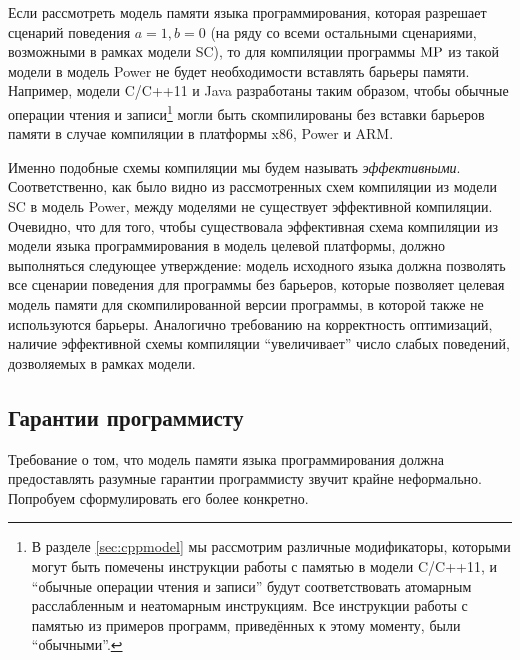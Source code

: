 Если рассмотреть модель памяти языка программирования, которая разрешает сценарий поведения $a=1,b=0$
(на ряду со всеми остальными сценариями, возможными в рамках модели SC), то для компиляции программы
${\rm MP}$ из такой модели в модель Power не будет необходимости вставлять барьеры памяти.
Например, модели C/C++11 \cite{Batty-al:POPL11} и Java \cite{Manson-al:POPL05} разработаны таким образом, чтобы
обычные операции чтения и записи\footnote{В разделе \ref{sec:cppmodel} мы рассмотрим различные модификаторы, которыми могут
быть помечены инструкции работы с памятью в модели C/C++11, и ``обычные операции чтения и записи'' будут соответствовать
атомарным расслабленным и неатомарным инструкциям.
Все инструкции работы с памятью из примеров программ, приведённых к этому моменту, были ``обычными''.}
могли быть скомпилированы без вставки барьеров памяти в случае компиляции в платформы x86, Power и ARM.

Именно подобные схемы компиляции мы будем называть \emph{эффективными}.
Соответственно, как было видно из рассмотренных схем компиляции из модели SC в модель Power, между моделями
не существует эффективной компиляции.
Очевидно, что для того, чтобы существовала эффективная схема компиляции из модели языка программирования в модель
целевой платформы, должно выполняться следующее утверждение:
модель исходного языка должна позволять все сценарии поведения для программы без барьеров,
которые позволяет целевая модель памяти для скомпилированной версии программы, в которой также не используются барьеры.
Аналогично требованию на корректность оптимизаций, наличие эффективной схемы компиляции ``увеличивает'' число
слабых поведений, дозволяемых в рамках модели.



\subsection{Гарантии программисту} %
Требование о том, что модель памяти языка программирования должна предоставлять разумные
гарантии программисту звучит крайне неформально.
Попробуем сформулировать его более конкретно.

